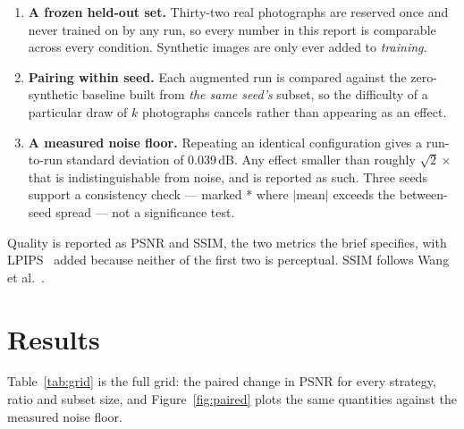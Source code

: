 \documentclass{article}
\begin{document}
\begin{enumerate}[leftmargin=1.6em]
  \item \textbf{A frozen held-out set.} Thirty-two real photographs are
  reserved once and never trained on by any run, so every number in this report
  is comparable across every condition. Synthetic images are only ever added to
  \emph{training}.
  \item \textbf{Pairing within seed.} Each augmented run is compared against
  the zero-synthetic baseline built from \emph{the same seed's} subset, so the
  difficulty of a particular draw of $k$ photographs cancels rather than
  appearing as an effect.
  \item \textbf{A measured noise floor.} Repeating an identical configuration
  gives a run-to-run standard deviation of 0.039\,dB. Any effect smaller
  than roughly $\sqrt{2}\times$ that is indistinguishable from noise, and is
  reported as such. Three seeds support a consistency check --- marked * where
  $|\text{mean}|$ exceeds the between-seed spread --- not a significance test.
\end{enumerate}

Quality is reported as PSNR and SSIM, the two metrics the brief
specifies, with LPIPS~\cite{zhang2018lpips} added because neither of the
first two is perceptual. SSIM follows Wang et al.~\cite{wang2004ssim}.

\section{Results}

Table~\ref{tab:grid} is the full grid: the paired change in PSNR for every
strategy, ratio and subset size, and Figure~\ref{fig:paired} plots the same
quantities against the measured noise floor.
\end{document}
